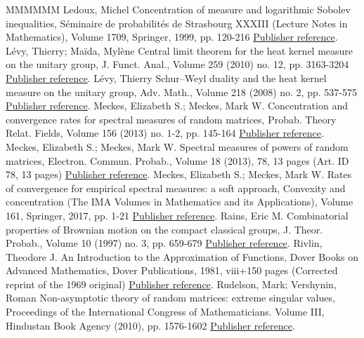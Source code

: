 \begin{thebibliography}{MMMMMM}
 Ledoux, Michel Concentration of measure and logarithmic Sobolev inequalities, Séminaire de probabilités de Strasbourg XXXIII (Lecture Notes in Mathematics), Volume 1709, Springer, 1999, pp. 120-216 \href{https://ahl.centre-mersenne.org/item/AHL_2018__1__247_0/#Ledoux1999}{Publisher reference}.
 Lévy, Thierry; Maïda, Mylène Central limit theorem for the heat kernel measure on the unitary group, J. Funct. Anal., Volume 259 (2010) no. 12, pp. 3163-3204 \href{https://ahl.centre-mersenne.org/item/AHL_2018__1__247_0/#LevyMaida2010}{Publisher reference}.
 Lévy, Thierry Schur–Weyl duality and the heat kernel measure on the unitary group, Adv. Math., Volume 218 (2008) no. 2, pp. 537-575 \href{https://ahl.centre-mersenne.org/item/AHL_2018__1__247_0/#Levy2008}{Publisher reference}.
 Meckes, Elizabeth S.; Meckes, Mark W. Concentration and convergence rates for spectral measures of random matrices, Probab. Theory Relat. Fields, Volume 156 (2013) no. 1-2, pp. 145-164 \href{https://ahl.centre-mersenne.org/item/AHL_2018__1__247_0/#MM-PTRF-2013}{Publisher reference}.
 Meckes, Elizabeth S.; Meckes, Mark W. Spectral measures of powers of random matrices, Electron. Commun. Probab., Volume 18 (2013), 78, 13 pages (Art. ID 78, 13 pages) \href{https://ahl.centre-mersenne.org/item/AHL_2018__1__247_0/#MM-ECP-2013}{Publisher reference}.
 Meckes, Elizabeth S.; Meckes, Mark W. Rates of convergence for empirical spectral measures: a soft approach, Convexity and concentration (The IMA Volumes in Mathematics and its Applications), Volume 161, Springer, 2017, pp. 1-21 \href{https://ahl.centre-mersenne.org/item/AHL_2018__1__247_0/#MM2016}{Publisher reference}.
 Rains, Eric M. Combinatorial properties of Brownian motion on the compact classical groups, J. Theor. Probab., Volume 10 (1997) no. 3, pp. 659-679 \href{https://ahl.centre-mersenne.org/item/AHL_2018__1__247_0/#Rains1997}{Publisher reference}.
 Rivlin, Theodore J. An Introduction to the Approximation of Functions, Dover Books on Advanced Mathematics, Dover Publications, 1981, viii+150 pages (Corrected reprint of the 1969 original) \href{https://ahl.centre-mersenne.org/item/AHL_2018__1__247_0/#Rivlin1981}{Publisher reference}.
 Rudelson, Mark; Vershynin, Roman Non-asymptotic theory of random matrices: extreme singular values, Proceedings of the International Congress of Mathematicians. Volume III, Hindustan Book Agency (2010), pp. 1576-1602 \href{https://ahl.centre-mersenne.org/item/AHL_2018__1__247_0/#RudVer10}{Publisher reference}.

\end{thebibliography}
